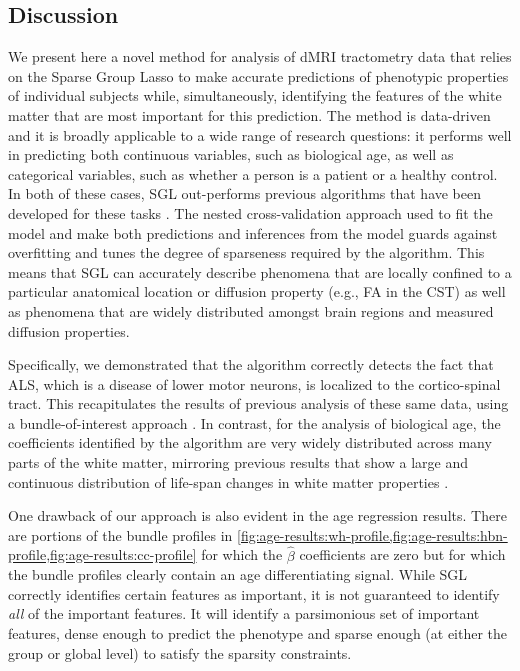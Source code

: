 \documentclass[10pt,%
               aps,%
               prl,%
               preprint,%
               superscriptaddress,%
               preprintnumbers,%
               amsmath,%
               floatfix,%
               endfloats*]{revtex4-1}
\begin{document}
\subsection*{Discussion}

We present here a novel method for analysis of dMRI tractometry data that
relies on the Sparse Group Lasso \cite{simon2013sparse} to make accurate
predictions of phenotypic properties of individual subjects while,
simultaneously, identifying the features of the white matter that are
most important for this prediction. The method is data-driven and it is broadly applicable to a wide range of research questions: it
performs well in predicting both continuous variables, such as biological
age, as well as categorical variables, such as whether a person is a patient
or a healthy control. In both of these cases, SGL out-performs previous
algorithms that have been developed for these tasks
\cite{sarica2017corticospinal, Richard2018-ux, mcpherson2020single}. The
nested cross-validation approach used to fit the model and make both
predictions and inferences from the model guards against overfitting and
tunes the degree of sparseness required by the algorithm. This means that SGL
can accurately describe phenomena that are locally confined to a particular
anatomical location or diffusion property (e.g., FA in the CST) as well as
phenomena that are widely distributed amongst brain regions and measured
diffusion properties.

Specifically, we demonstrated that the algorithm correctly detects the fact
that ALS, which is a disease of lower motor neurons, is localized to the
cortico-spinal tract. This recapitulates the results of previous analysis of
these same data, using a bundle-of-interest approach
\cite{sarica2017corticospinal}. In contrast, for the analysis of biological
age, the coefficients identified by the algorithm are very widely distributed
across many parts of the white matter, mirroring previous results that show a
large and continuous distribution of life-span changes in white matter
properties \cite{yeatman2014lifespan}.

One drawback of our approach is also evident in the age regression results.
There are portions of the bundle profiles in
\cref{fig:age-results:wh-profile,fig:age-results:hbn-profile,fig:age-results:cc-profile}
for which the $\hat{\beta}$ coefficients are zero but for which the bundle
profiles clearly contain an age differentiating signal. While SGL correctly
identifies certain features as important, it is not guaranteed to identify
\emph{all} of the important features. It will identify a parsimonious set of
important features, dense enough to predict the phenotype and sparse enough
(at either the group or global level) to satisfy the sparsity constraints.
\end{document}
